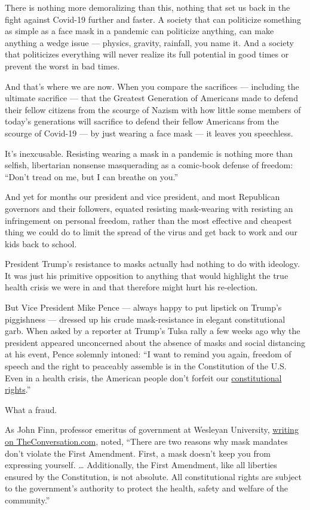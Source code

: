 There is nothing more demoralizing than this, nothing that set us back
in the fight against Covid-19 further and faster. A society that can
politicize something as simple as a face mask in a pandemic can
politicize anything, can make anything a wedge issue --- physics,
gravity, rainfall, you name it. And a society that politicizes
everything will never realize its full potential in good times or
prevent the worst in bad times.

And that's where we are now. When you compare the sacrifices ---
including the ultimate sacrifice --- that the Greatest Generation of
Americans made to defend their fellow citizens from the scourge of
Nazism with how little some members of today's generations will
sacrifice to defend their fellow Americans from the scourge of Covid-19
--- by just wearing a face mask --- it leaves you speechless.

It's inexcusable. Resisting wearing a mask in a pandemic is nothing more
than selfish, libertarian nonsense masquerading as a comic-book defense
of freedom: ``Don't tread on me, but I can breathe on you.''

And yet for months our president and vice president, and most Republican
governors and their followers, equated resisting mask-wearing with
resisting an infringement on personal freedom, rather than the most
effective and cheapest thing we could do to limit the spread of the
virus and get back to work and our kids back to school.

President Trump's resistance to masks actually had nothing to do with
ideology. It was just his primitive opposition to anything that would
highlight the true health crisis we were in and that therefore might
hurt his re-election.

But Vice President Mike Pence --- always happy to put lipstick on
Trump's piggishness --- dressed up his crude mask-resistance in elegant
constitutional garb. When asked by a reporter at Trump's Tulsa rally a
few weeks ago why the president appeared unconcerned about the absence
of masks and social distancing at his event, Pence solemnly intoned: ``I
want to remind you again, freedom of speech and the right to peaceably
assemble is in the Constitution of the U.S. Even in a health crisis, the
American people don't forfeit our
\href{https://www.esquire.com/news-politics/politics/a32984272/mike-pence-masks-social-distancing-trump-rallies/}{constitutional
rights}.''

What a fraud.

As John Finn, professor emeritus of government at Wesleyan University,
\href{https://theconversation.com/the-constitution-doesnt-have-a-problem-with-mask-mandates-142335}{writing
on TheConversation.com}, noted, ``There are two reasons why mask
mandates don't violate the First Amendment. First, a mask doesn't keep
you from expressing yourself. \ldots{} Additionally, the First
Amendment, like all liberties ensured by the Constitution, is not
absolute. All constitutional rights are subject to the government's
authority to protect the health, safety and welfare of the community.''

